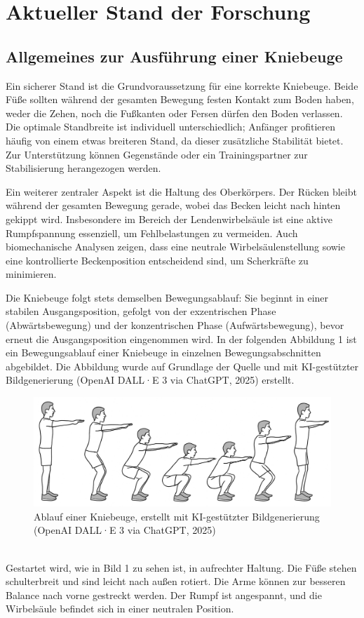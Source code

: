 \section{Aktueller Stand der Forschung}
\subsection{Allgemeines zur Ausführung einer Kniebeuge}
\noindent Ein sicherer Stand ist die Grundvoraussetzung für eine korrekte Kniebeuge. Beide Füße sollten während der gesamten Bewegung festen Kontakt zum Boden haben, weder die Zehen, noch die Fußkanten oder Fersen dürfen den Boden verlassen. Die optimale Standbreite ist individuell unterschiedlich; Anfänger profitieren häufig von einem etwas breiteren Stand, da dieser zusätzliche Stabilität bietet. Zur Unterstützung können Gegenstände oder ein Trainingspartner zur Stabilisierung herangezogen werden. \cite{Meinart}

\noindent Ein weiterer zentraler Aspekt ist die Haltung des Oberkörpers. Der Rücken bleibt während der gesamten Bewegung gerade, wobei das Becken leicht nach hinten gekippt wird. Insbesondere im Bereich der Lendenwirbelsäule ist eine aktive Rumpfspannung essenziell, um Fehlbelastungen zu vermeiden. \cite{Meinart} Auch biomechanische Analysen zeigen, dass eine neutrale Wirbelsäulenstellung sowie eine kontrollierte Beckenposition entscheidend sind, um Scherkräfte zu minimieren. \cite{schoenfeld2010kinematics}

\noindent Die Kniebeuge folgt stets demselben Bewegungsablauf: Sie beginnt in einer stabilen Ausgangsposition, gefolgt von der exzentrischen Phase (Abwärtsbewegung) und der konzentrischen Phase (Aufwärtsbewegung), bevor erneut die Ausgangsposition eingenommen wird. \cite{Meinart}
\noindent In der folgenden Abbildung 1 ist ein Bewegungsablauf einer Kniebeuge in einzelnen Bewegungsabschnitten abgebildet. Die Abbildung wurde auf Grundlage der Quelle \cite{schoenfeld2010kinematics} und \cite{Meinart} mit KI-gestützter Bildgenerierung (OpenAI DALL·E 3 via ChatGPT, 2025) erstellt. 
\\
\begin{figure}[ht]\centering
\includegraphics[width=0.75\linewidth]{images/Kniebeuge.jpeg}
\caption{Ablauf einer Kniebeuge, erstellt mit KI-gestützter Bildgenerierung (OpenAI DALL·E 3 via ChatGPT, 2025)}
\label{fig: Kniebeuge}
\end{figure}
\\
\noindent Gestartet wird, wie in Bild 1 zu sehen ist, in aufrechter Haltung. Die Füße stehen schulterbreit und sind leicht nach außen rotiert. Die Arme können zur besseren Balance nach vorne gestreckt werden. Der Rumpf ist angespannt, und die Wirbelsäule befindet sich in einer neutralen Position. \cite{Meinart}

